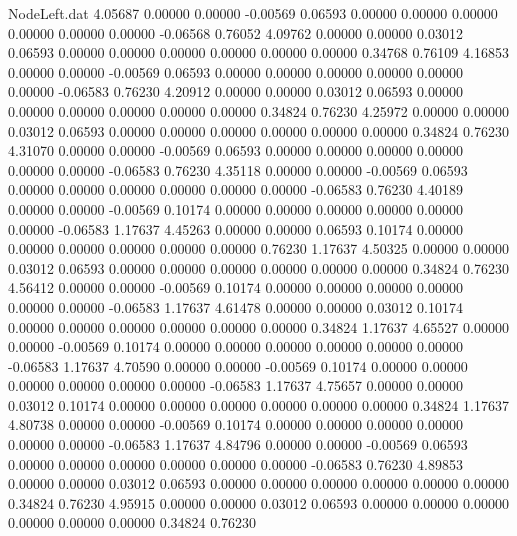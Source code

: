 \begin{filecontents}{NodeLeft.dat}
   4.05687    0.00000    0.00000    -0.00569    0.06593    0.00000    0.00000    0.00000    0.00000    0.00000    0.00000   -0.06568    0.76052
   4.09762    0.00000    0.00000     0.03012    0.06593    0.00000    0.00000    0.00000    0.00000    0.00000    0.00000    0.34768    0.76109
   4.16853    0.00000    0.00000    -0.00569    0.06593    0.00000    0.00000    0.00000    0.00000    0.00000    0.00000   -0.06583    0.76230
   4.20912    0.00000    0.00000     0.03012    0.06593    0.00000    0.00000    0.00000    0.00000    0.00000    0.00000    0.34824    0.76230
   4.25972    0.00000    0.00000     0.03012    0.06593    0.00000    0.00000    0.00000    0.00000    0.00000    0.00000    0.34824    0.76230
   4.31070    0.00000    0.00000    -0.00569    0.06593    0.00000    0.00000    0.00000    0.00000    0.00000    0.00000   -0.06583    0.76230
   4.35118    0.00000    0.00000    -0.00569    0.06593    0.00000    0.00000    0.00000    0.00000    0.00000    0.00000   -0.06583    0.76230
   4.40189    0.00000    0.00000    -0.00569    0.10174    0.00000    0.00000    0.00000    0.00000    0.00000    0.00000   -0.06583    1.17637
   4.45263    0.00000    0.00000     0.06593    0.10174    0.00000    0.00000    0.00000    0.00000    0.00000    0.00000    0.76230    1.17637
   4.50325    0.00000    0.00000     0.03012    0.06593    0.00000    0.00000    0.00000    0.00000    0.00000    0.00000    0.34824    0.76230
   4.56412    0.00000    0.00000    -0.00569    0.10174    0.00000    0.00000    0.00000    0.00000    0.00000    0.00000   -0.06583    1.17637
   4.61478    0.00000    0.00000     0.03012    0.10174    0.00000    0.00000    0.00000    0.00000    0.00000    0.00000    0.34824    1.17637
   4.65527    0.00000    0.00000    -0.00569    0.10174    0.00000    0.00000    0.00000    0.00000    0.00000    0.00000   -0.06583    1.17637
   4.70590    0.00000    0.00000    -0.00569    0.10174    0.00000    0.00000    0.00000    0.00000    0.00000    0.00000   -0.06583    1.17637
   4.75657    0.00000    0.00000     0.03012    0.10174    0.00000    0.00000    0.00000    0.00000    0.00000    0.00000    0.34824    1.17637
   4.80738    0.00000    0.00000    -0.00569    0.10174    0.00000    0.00000    0.00000    0.00000    0.00000    0.00000   -0.06583    1.17637
   4.84796    0.00000    0.00000    -0.00569    0.06593    0.00000    0.00000    0.00000    0.00000    0.00000    0.00000   -0.06583    0.76230
   4.89853    0.00000    0.00000     0.03012    0.06593    0.00000    0.00000    0.00000    0.00000    0.00000    0.00000    0.34824    0.76230
   4.95915    0.00000    0.00000     0.03012    0.06593    0.00000    0.00000    0.00000    0.00000    0.00000    0.00000    0.34824    0.76230

\end{filecontents}
